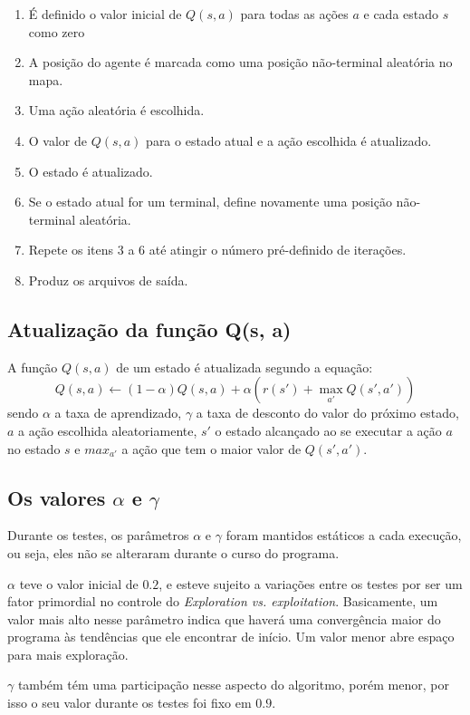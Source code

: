 \documentclass[11pt]{article}
\begin{document}
\begin{enumerate}
	\item É definido o valor inicial de $Q(s, a)$ para todas as ações $a$ e cada estado $s$ como zero
	\item A posição do agente é marcada como uma posição não-terminal aleatória no mapa.
	\item Uma ação aleatória é escolhida.
	\item O valor de $Q(s, a)$ para o estado atual e a ação escolhida é atualizado.
	\item O estado é atualizado.
	\item Se o estado atual for um terminal, define novamente uma posição não-terminal aleatória.
	\item Repete os itens 3 a 6 até atingir o número pré-definido de iterações.
	\item Produz os arquivos de saída.
\end{enumerate}

\subsection{Atualização da função Q(s, a)}

A função $Q(s, a)$ de um estado é atualizada segundo a equação:
$$Q(s, a) \leftarrow (1 - \alpha)Q(s, a) + \alpha(r(s')+\max_{a'} Q(s', a'))$$
sendo $\alpha$ a taxa de aprendizado, $\gamma$ a taxa de desconto do valor do próximo estado, $a$ a ação escolhida aleatoriamente, $s'$ o estado alcançado ao se executar a ação $a$ no estado $s$ e $max_{a'}$ a ação que tem o maior valor de $Q(s', a')$.

\subsection{Os valores $\alpha$ e $\gamma$}

Durante os testes, os parâmetros $\alpha$ e $\gamma$ foram mantidos estáticos a cada execução, ou seja, eles não se alteraram durante o curso do programa.

$\alpha$ teve o valor inicial de $0.2$, e esteve sujeito a variações entre os testes por ser um fator primordial no controle do \textit{Exploration vs. exploitation}. Basicamente, um valor mais alto nesse parâmetro indica que haverá uma convergência maior do programa às tendências que ele encontrar de início. Um valor menor abre espaço para mais exploração.

$\gamma$ também tém uma participação nesse aspecto do algoritmo, porém menor, por isso o seu valor durante os testes foi fixo em $0.9$.
\end{document}
